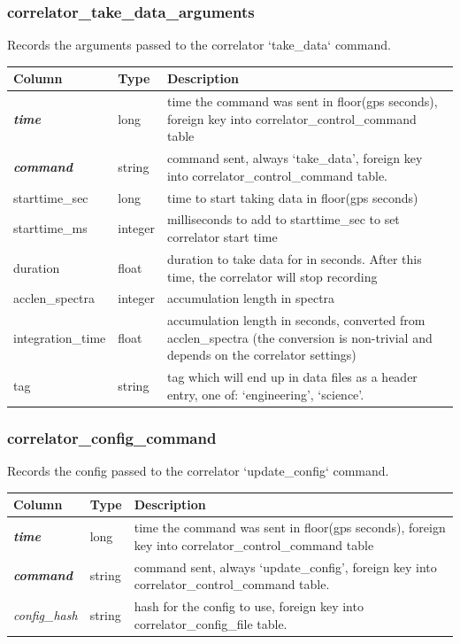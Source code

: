 \documentclass{article}
\begin{document}
\subsubsection{correlator\_take\_data\_arguments}
Records the arguments passed to the correlator `take\_data` command.
\begin{center}
 \begin{tabular}{| p{4cm} | p{2cm} | p{10cm} |}
\hline
 {\bf Column} & {\bf Type}  & {\bf Description} \\ [0.5ex]  \hline\hline
\textbf{\textit{time}} & long & time the command was sent in floor(gps seconds), foreign key into correlator\_control\_command table\\ \hline
\textbf{\textit{command}} & string & command sent, always `take\_data', foreign key into correlator\_control\_command table.  \\ \hline
starttime\_sec & long & time to start taking data in floor(gps seconds) \\\hline
starttime\_ms & integer & milliseconds to add to starttime\_sec to set correlator start time\\\hline
duration & float & duration to take data for in seconds. After this time, the correlator will stop recording\\\hline
acclen\_spectra & integer & accumulation length in spectra\\\hline
integration\_time & float & accumulation length in seconds, converted from acclen\_spectra (the conversion is non-trivial and depends on the correlator settings)\\\hline
tag & string & tag which will end up in data files as a header entry, one of: `engineering', `science'.\\\hline
\end{tabular}
\end{center}

\subsubsection{correlator\_config\_command}
Records the config passed to the correlator `update\_config` command.
\begin{center}
 \begin{tabular}{| p{4cm} | p{2cm} | p{10cm} |}
\hline
 {\bf Column} & {\bf Type}  & {\bf Description} \\ [0.5ex]  \hline\hline
\textbf{\textit{time}} & long & time the command was sent in floor(gps seconds), foreign key into correlator\_control\_command table\\ \hline
\textbf{\textit{command}} & string & command sent, always `update\_config', foreign key into correlator\_control\_command table.  \\ \hline
\textit{config\_hash} & string & hash for the config to use, foreign key into correlator\_config\_file table.\\ \hline
\end{tabular}
\end{center}
\end{document}
